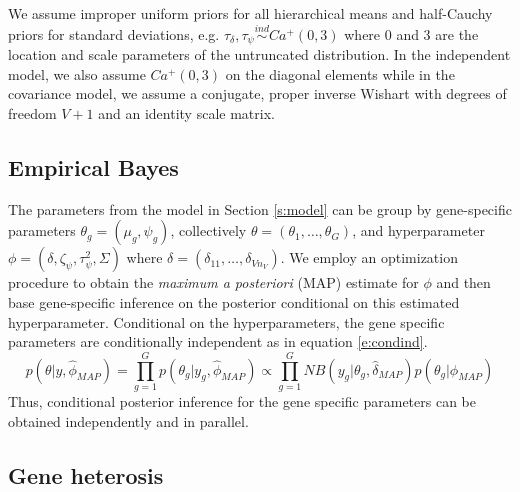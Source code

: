 \documentclass[useAMS,usenatbib,referee]{biom}
\begin{document}
We assume improper uniform priors for all hierarchical means and half-Cauchy priors for standard deviations, e.g. $\tau_\delta, \tau_\psi \stackrel{ind}{\sim} Ca^+(0,3)$ where 0 and 3 are the location and scale parameters of the untruncated distribution. In the independent model, we also assume $Ca^+(0,3)$ on the diagonal elements while in the covariance model, we assume a conjugate, proper inverse Wishart with degrees of freedom $V+1$ and an identity scale matrix. 

\subsection{Empirical Bayes}
\label{s:ebayes}

The parameters from the model in Section \ref{s:model} can be group by gene-specific parameters $\theta_g = (\mu_g,\psi_g)$, collectively $\theta = (\theta_1,\ldots,\theta_G)$, and hyperparameter $\phi = (\delta, \zeta_\psi, \tau_\psi^2, \Sigma)$ where $\delta = (\delta_{11},\ldots,\delta_{Vn_V})$. We employ an optimization procedure to obtain the \emph{maximum a posteriori} (MAP) estimate for $\phi$ and then base gene-specific inference on the posterior conditional on this estimated hyperparameter. Conditional on the hyperparameters, the gene specific parameters are conditionally independent as in equation \eqref{e:condind}. 
\begin{equation}
p(\theta|y,\hat{\phi}_{MAP}) = \prod_{g=1}^G p(\theta_g|y_g,\hat{\phi}_{MAP}) \propto \prod_{g=1}^G NB(y_g|\theta_g,\hat{\delta}_{MAP})p(\theta_g|\hat{\phi}_{MAP}) 
\label{e:condind}
\end{equation}
Thus, conditional posterior inference for the gene specific parameters can be obtained independently and in parallel. 



\subsection{Gene heterosis}
\label{s:gene_heterosis}
\end{document}
